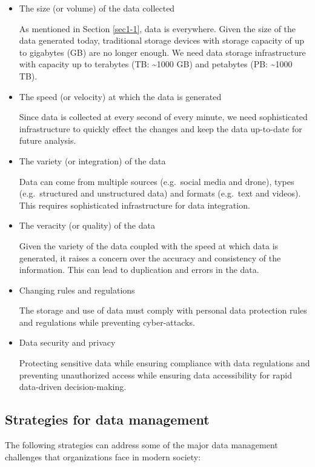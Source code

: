 \documentclass[
]{book}
\begin{document}
\begin{itemize}
\item
  The size (or volume) of the data collected

  As mentioned in Section \ref{sec1-1}, data is everywhere. Given the size of the data generated today, traditional storage devices with storage capacity of up to gigabytes (GB) are no longer enough. We need data storage infrastructure with capacity up to terabytes (TB: \textasciitilde1000 GB) and petabytes (PB: \textasciitilde1000 TB).
\item
  The speed (or velocity) at which the data is generated

  Since data is collected at every second of every minute, we need sophisticated infrastructure to quickly effect the changes and keep the data up-to-date for future analysis.
\item
  The variety (or integration) of the data

  Data can come from multiple sources (e.g.~social media and drone), types (e.g.~structured and unstructured data) and formats (e.g.~text and videos). This requires sophisticated infrastructure for data integration.
\item
  The veracity (or quality) of the data

  Given the variety of the data coupled with the speed at which data is generated, it raises a concern over the accuracy and consistency of the information. This can lead to duplication and errors in the data.
\item
  Changing rules and regulations

  The storage and use of data must comply with personal data protection rules and regulations while preventing cyber-attacks.
\item
  Data security and privacy

  Protecting sensitive data while ensuring compliance with data regulations and preventing unauthorized access while ensuring data accessibility for rapid data-driven decision-making.
\end{itemize}

\subsection{Strategies for data management}\label{strategies-for-data-management}

The following strategies can address some of the major data management challenges that organizations face in modern society:
\end{document}
